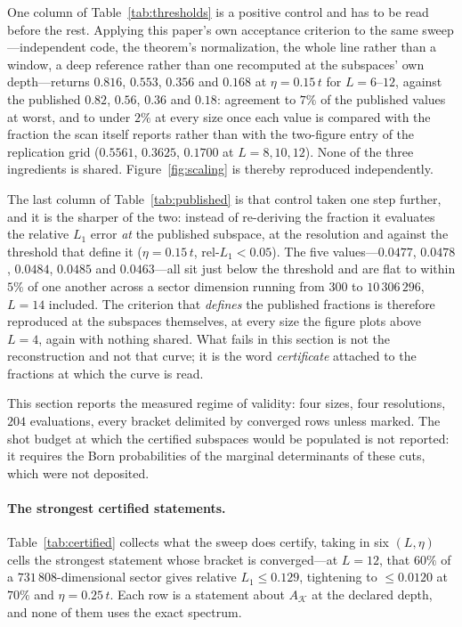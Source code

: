 One column of Table~\ref{tab:thresholds} is a positive control and has to be read before the rest.
Applying this paper's own acceptance criterion to the same sweep---independent code, the theorem's
normalization, the whole line rather than a window, a deep reference rather than one recomputed at the
subspaces' own depth---returns $0.816$, $0.553$, $0.356$ and $0.168$ at $\eta=0.15\,t$ for
$L=6$--$12$, against the published $0.82$, $0.56$, $0.36$ and $0.18$: agreement to $7\%$ of the published values at worst, and
to under $2\%$ at every size once each value is compared with the fraction the scan itself reports
rather than with the two-figure entry of the replication grid ($0.5561$, $0.3625$, $0.1700$ at
$L=8,10,12$). None of the three ingredients is shared. Figure~\ref{fig:scaling} is thereby reproduced
independently.

The last column of Table~\ref{tab:published} is that control taken one step further, and it is the
sharper of the two: instead of re-deriving the fraction it evaluates the relative $L_1$ error
\emph{at} the published subspace, at the resolution and against the threshold that define it
($\eta=0.15\,t$, rel-$L_1<0.05$). The five values---$0.0477$, $0.0478$, $0.0484$, $0.0485$ and
$0.0463$---all sit just below the threshold and are flat to within $5\%$ of one another across a
sector dimension running from $300$ to $10\,306\,296$, $L=14$ included. The criterion that
\emph{defines} the published fractions is therefore reproduced at the subspaces themselves, at every
size the figure plots above $L=4$, again with nothing shared. What fails in this section is not the
reconstruction and not that curve; it is the word
\emph{certificate} attached to the fractions at which the curve is read.

%
%

%
%
This section reports the measured regime of validity: four sizes, four resolutions, $204$
evaluations, every bracket delimited by converged rows unless marked. The shot budget at which the certified
subspaces would be populated is not reported: it requires the Born probabilities of the marginal
determinants of these cuts, which were not deposited.

\paragraph{The strongest certified statements.} Table~\ref{tab:certified} collects what the sweep does certify, taking in six $(L,\eta)$ cells the strongest
statement whose bracket is converged---at $L=12$, that $60\%$ of a $731\,808$-dimensional sector gives
relative $L_1\le0.129$, tightening to $\le0.0120$ at $70\%$ and $\eta=0.25\,t$. Each row is a statement
about $A_{\mathcal K}$ at the declared depth, and none of them uses the exact spectrum.

